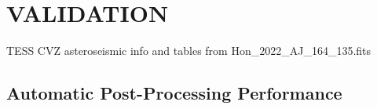 \documentclass[
  journal=pasa,
  manuscript=research-paper, %
  year=2023,
  volume=37
]{cup-journal}
\newcommand{\SB}[1]{{\textcolor{purple}{#1}}}
\newcommand{\Teff}{$T_\mathrm{eff}$\xspace}
\newcommand{\logg}{$\log g$\xspace}
\newcommand{\vsini}{$v \sin i$\xspace}
\newcommand{\TheCannon}{\textit{The Cannon}\xspace}
\newcommand{\dex}{\,\mathrm{dex}}	%
\newcommand{\K}{\,\mathrm{K}}	%
\newcommand{\kms}{\,\mathrm{km\,s^{-1}}}	%
\begin{document}
%
%
%
%
%
%
%
%
%
%


\section{VALIDATION}
\label{sec:validation}

TESS CVZ asteroseismic info \citep{Hon2022} and tables from Hon\_2022\_AJ\_164\_135.fits

\subsection{Automatic Post-Processing Performance}
\end{document}
